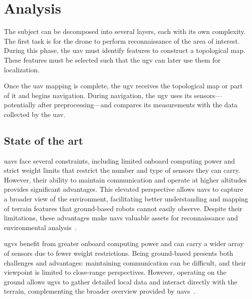 \chapter{Analysis}\label{ch:analysis}

The subject can be decomposed into several layers, each with its own complexity.
The first task is for the drone to perform reconnaissance of the area of interest.
During this phase, the \gls{uav} must identify features to construct a topological map.
These features must be selected such that the \gls{ugv} can later use them for localization.

Once the \gls{uav} mapping is complete, the \gls{ugv} receives the topological map or part of it and begins navigation.
During navigation, the \gls{ugv} uses its sensors—potentially after preprocessing—and compares its measurements with the
data collected by the \gls{uav}.


\section{State of the art}\label{sec:state-of-the-art}



\glspl{uav} face several constraints, including limited onboard computing power and strict weight limits that restrict
the number and type of sensors they can carry.
However, their ability to maintain communication and operate at higher altitudes provides significant advantages.
This elevated perspective allows \glspl{uav} to capture a broader view of the environment, facilitating better understanding
and mapping of terrain features that ground-based robots cannot easily observe.
Despite their limitations, these advantages make \glspl{uav} valuable assets for reconnaissance and environmental analysis~\cite{munasinghe_comprehensive_2024}.

\glspl{ugv} benefit from greater onboard computing power and can carry a wider array of sensors due to fewer weight restrictions.
Being ground-based presents both challenges and advantages: maintaining communication can be difficult, and their viewpoint is limited to close-range perspectives.
However, operating on the ground allows \glspl{ugv} to gather detailed local data and interact directly with the terrain,
complementing the broader overview provided by \glspl{uav}~\cite{munasinghe_comprehensive_2024}.

